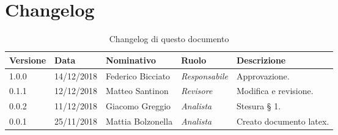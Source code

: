 \section*{Changelog}
\begin{table}[tbph]
        \centering
        \begin{tabularx}{\textwidth}{|l|l|l|l|X|}
                \hline
                \textbf{Versione} & \textbf{Data} & \textbf{Nominativo}  & \textbf{Ruolo} & 
                \textbf{Descrizione}\\
                \hline 
                
                \hline
                1.0.0 & 14/12/2018 & Federico Bicciato & \textit{Responsabile}
                & Approvazione.\\
                
                \hline
                0.1.1 & 12/12/2018 & Matteo Santinon & \textit{Revisore}
                & Modifica e revisione.\\
                
                \hline
                0.0.2 & 11/12/2018 &  Giacomo Greggio & \textit{Analista}
                & Stesura § 1.\\

                \hline
                0.0.1 & 25/11/2018 & Mattia Bolzonella & \textit{Analista}
                & Creato documento latex.\\
                
                \hline
                
        \end{tabularx}
        \caption{Changelog di questo documento}
\end{table}